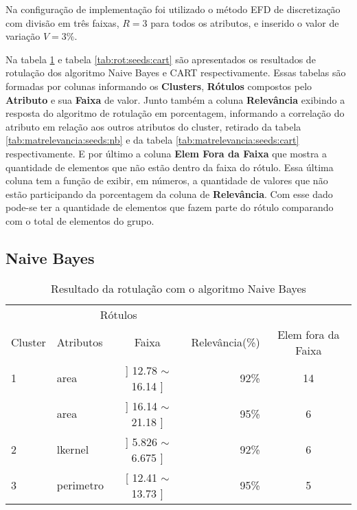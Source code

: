 Na configuração de implementação foi utilizado o método EFD de discretização com divisão em três faixas, ${R=3}$ para todos os atributos, e inserido o valor de variação ${V=3\%}$.

Na tabela \ref{tab:rot:seeds:nb} e tabela \ref{tab:rot:seeds:cart} são  apresentados os resultados de rotulação dos algoritmo Naive Bayes e CART respectivamente. Essas tabelas são formadas por colunas informando os \textbf{Clusters}, \textbf{Rótulos}  compostos pelo \textbf{Atributo} e sua \textbf{Faixa} de valor. Junto também a coluna \textbf{Relevância} exibindo a resposta do algoritmo de rotulação em porcentagem, informando a correlação do atributo em relação aos outros atributos do cluster, retirado da tabela \ref{tab:matrelevancia:seeds:nb} e da tabela \ref{tab:matrelevancia:seeds:cart} respectivamente. E por último a coluna \textbf{Elem Fora da Faixa} que mostra a quantidade de elementos que não estão dentro da faixa do rótulo. Essa última coluna tem a função de exibir, em números, a quantidade de valores que não estão participando da porcentagem da coluna de \textbf{Relevância}. Com esse dado pode-se ter a quantidade de elementos que fazem parte do rótulo comparando com o total de elementos do grupo.

\subsection{Naive Bayes} \label{cap:resultados:ssec:seed:nb}
\begin{table}[!h]
\centering
\caption{Resultado da rotulação com o algoritmo Naive Bayes}
\label{tab:rot:seeds:nb}
\begin{tabular}{llcrc}
\hline
\multicolumn{1}{c}{\cellcolor[HTML]{FFFFFF}} & \multicolumn{2}{c}{Rótulos}                & \multicolumn{1}{r}{}               & \\ \cline{2-3}
Cluster                                      & Atributos      & \multicolumn{1}{c}{Faixa} & \multicolumn{1}{c}{Relevância(\%)} & Elem fora da Faixa\\ \hline \hline
1                                            & area           & ] 12.78 $\sim$  16.14 ]   & 92\%                               & 14\\  \hline
                                             & area           & ] 16.14 $\sim$  21.18 ]   & 95\%                               & 6\\ 
\multirow{-2}{*}{2}                          & lkernel        & ] 5.826 $\sim$  6.675 ]   & 92\%                               & 6\\  \hline
3                                            & perimetro      & [ 12.41 $\sim$  13.73 ]   & 95\%                               & 5\\ \hline \hline
\end{tabular}
\end{table}



